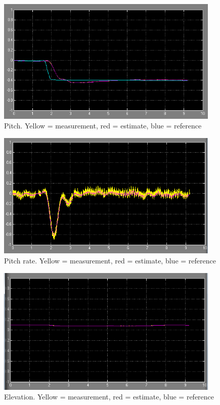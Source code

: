 \begin{figure}[H]
	\centering
	\includegraphics[width=0.95\textwidth]{images/est_med_int/p_est.png}
	\caption{Pitch. Yellow = measurement, red = estimate, blue = reference}
	\label{fig:pest}
\end{figure}
\begin{figure}[H]
	\centering
	\includegraphics[width=0.95\textwidth]{images/est_med_int/pd_est.png}
	\caption{Pitch rate. Yellow = measurement, red = estimate, blue = reference}
	\label{fig:pdest}
\end{figure}
\begin{figure}[H]
	\centering
	\includegraphics[width=0.95\textwidth]{images/est_med_int/e_est.png}
	\caption{Elevation. Yellow = measurement, red = estimate, blue = reference}
	\label{fig:eest}
\end{figure}
